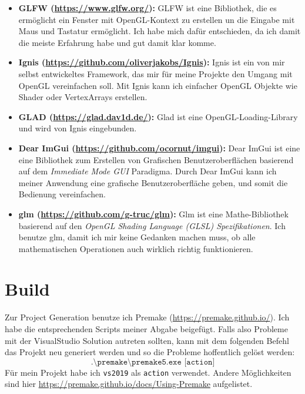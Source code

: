 \documentclass[a4paper,12pt]{article}
\begin{document}
\begin{itemize}
	\item \textbf{GLFW (\url{https://www.glfw.org/}):}
	GLFW ist eine Bibliothek, die es ermöglicht ein Fenster mit OpenGL-Kontext zu erstellen un die Eingabe mit Maus und Tastatur ermöglicht.
	Ich habe mich dafür entschieden, da ich damit die meiste Erfahrung habe und gut damit klar komme.
	\item \textbf{Ignis (\url{https://github.com/oliverjakobs/Ignis}):}
	Ignis ist ein von mir selbst entwickeltes Framework, das mir für meine Projekte den Umgang mit OpenGL vereinfachen soll. 
	Mit Ignis kann ich einfacher OpenGL Objekte wie Shader oder VertexArrays erstellen.
	\item \textbf{GLAD (\url{https://glad.dav1d.de/}):} 
	Glad ist eine OpenGL-Loading-Library und wird von Ignis eingebunden.
	\item \textbf{Dear ImGui (\url{https://github.com/ocornut/imgui}):}
	Dear ImGui ist eine eine Bibliothek zum Erstellen von Grafischen Benutzeroberflächen basierend auf dem \emph{Immediate Mode GUI} Paradigma.
	Durch Dear ImGui kann ich meiner Anwendung eine grafische Benutzeroberfläche geben, und somit die Bedienung vereinfachen.
	\item \textbf{glm (\url{https://github.com/g-truc/glm}):}
	Glm ist eine Mathe-Bibliothek basierend auf den \emph{OpenGL Shading Language (GLSL) Spezifikationen}. 
	Ich benutze glm, damit ich mir keine Gedanken machen muss, ob alle mathematischen Operationen auch wirklich richtig funktionieren. 
\end{itemize}

\section*{Build}

Zur Project Generation benutze ich Premake (\url{https://premake.github.io/}). Ich habe die entsprechenden Scripts meiner Abgabe beigefügt.
Falls also Probleme mit der VisualStudio Solution autreten sollten,
kann mit dem folgenden Befehl das Projekt neu generiert werden und so die Probleme hoffentlich gelöst werden:
\[\texttt{.\textbackslash premake\textbackslash premake5.exe [action]}\]
Für mein Projekt habe ich \texttt{vs2019} als \texttt{action} verwendet. Andere Möglichkeiten sind hier \url{https://premake.github.io/docs/Using-Premake} aufgelistet.
\end{document}
